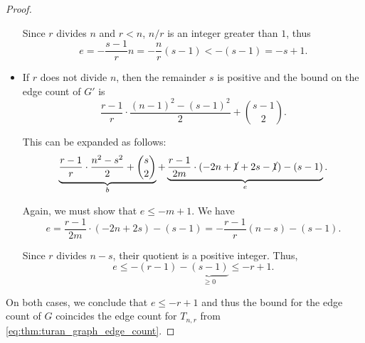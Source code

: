 \begin{proof}
\begin{itemize}
    Since \( r \) divides \( n \) and \( r < n \), \( n / r \) is an integer greater than \( 1 \), thus
    \begin{equation*}
      e = - \frac {s - 1} r n = - \frac n r (s - 1) < -(s - 1) = -s + 1.
    \end{equation*}

    \item If \( r \) does not divide \( n \), then the remainder \( s \) is positive and the bound on the edge count of \( G' \) is
    \begin{equation*}
      \frac {r - 1} r \cdot \frac {(n - 1)^2 - (s - 1)^2} 2 + \binom {s - 1} 2.
    \end{equation*}

    This can be expanded as follows:
    \begin{equation*}
      \underbrace{\frac {r - 1} r \cdot \frac {n^2 - s^2} 2 + \binom s 2}_b + \underbrace{\frac {r - 1} {2m} \cdot (-2n + \cancel{1} + 2s - \cancel{1}) - (s - 1)}_e.
    \end{equation*}

    Again, we must show that \( e \leq -m + 1 \). We have
    \begin{equation*}
      e = \frac {r - 1} {2m} \cdot (-2n + 2s) - (s - 1) = -\frac {r - 1} r (n - s) - (s - 1).
    \end{equation*}

    Since \( r \) divides \( n - s \), their quotient is a positive integer. Thus,
    \begin{equation*}
      e \leq -(r - 1) - \underbrace{(s - 1)}_{\geq 0} \leq -r + 1.
    \end{equation*}
  \end{itemize}

  On both cases, we conclude that \( e \leq -r + 1 \) and thus the bound for the edge count of \( G \) coincides the edge count for \( T_{n,r} \) from \eqref{eq:thm:turan_graph_edge_count}.
\end{proof}

